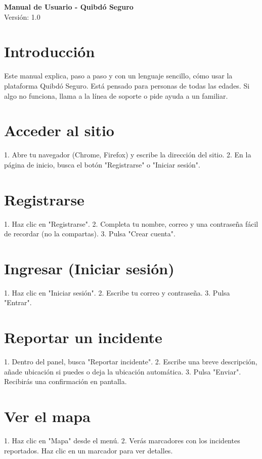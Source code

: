 \documentclass[12pt]{article}
\begin{document}
\begin{center}
  {\LARGE \textbf{Manual de Usuario - Quibdó Seguro}}\\[1em]
  {\large Versión: 1.0}\\[2em]
\end{center}

\section*{Introducción}
Este manual explica, paso a paso y con un lenguaje sencillo, cómo usar la plataforma Quibdó Seguro. Está pensado para personas de todas las edades. Si algo no funciona, llama a la línea de soporte o pide ayuda a un familiar.

\section*{Acceder al sitio}
1. Abre tu navegador (Chrome, Firefox) y escribe la dirección del sitio.
2. En la página de inicio, busca el botón "Registrarse" o "Iniciar sesión".

\section*{Registrarse}
1. Haz clic en "Registrarse".
2. Completa tu nombre, correo y una contraseña fácil de recordar (no la compartas).
3. Pulsa "Crear cuenta".

\section*{Ingresar (Iniciar sesión)}
1. Haz clic en "Iniciar sesión".
2. Escribe tu correo y contraseña.
3. Pulsa "Entrar".

\section*{Reportar un incidente}
1. Dentro del panel, busca "Reportar incidente".
2. Escribe una breve descripción, añade ubicación si puedes o deja la ubicación automática.
3. Pulsa "Enviar". Recibirás una confirmación en pantalla.

\section*{Ver el mapa}
1. Haz clic en "Mapa" desde el menú.
2. Verás marcadores con los incidentes reportados. Haz clic en un marcador para ver detalles.
\end{document}

